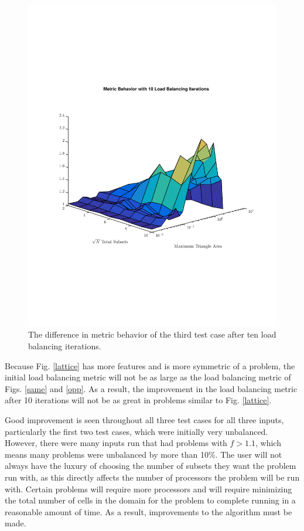 \documentclass{anstrans}
\begin{document}
\begin{figure}[H]
\centering
\includegraphics[scale=0.5, trim = 2cm 6cm 2cm 7cm,clip]{figures/lattice_iter.pdf}
\caption{The difference in metric behavior of the third test case after ten load balancing iterations.}
\label{latticeiter}
\end{figure}

Because Fig. \ref{lattice} has more features and is more symmetric of a problem, the initial load balancing metric will not be as large as the load balancing metric of Figs. \ref{same} and \ref{opp}. As a result, the improvement in the load balancing metric after 10 iterations will not be as great in problems similar to Fig. \ref{lattice}. 

Good improvement is seen throughout all three test cases for all three inputs, particularly the first two test cases, which were initially very unbalanced. However, there were many inputs run that had problems with $f > 1.1$, which means many problems were unbalanced by more than 10\%. The user will not always have the luxury of choosing the number of subsets they want the problem run with, as this directly affects the number of processors the problem will be run with. Certain problems will require more processors and will require minimizing the total number of cells in the domain for the problem to complete running in a reasonable amount of time. As a result, improvements to the algorithm must be made. 
\end{document}
